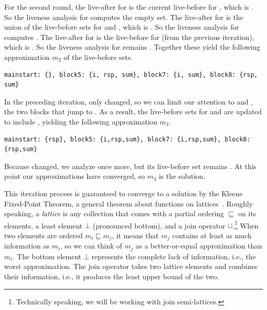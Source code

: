 \documentclass[7x10]{TimesAPriori_MIT}%
\begin{document}
For the second round, the live-after for  is the
current live-before for , which is .  So the
liveness analysis for  computes the empty set. The
live-after for  is the union of the live-before sets for
 and , which is .
So the liveness analysis for  computes .  The live-after for  is the live-before for
 (from the previous iteration), which is .
So the liveness analysis for  remains .  Together these yield the following approximation $m_2$ of
the live-before sets.
\begin{center}
  \begin{lstlisting}
mainstart: {}, block5: {i, rsp, sum}, block7: {i, sum}, block8: {rsp, sum}
\end{lstlisting}
\end{center}
In the preceding iteration, only  changed, so we can
limit our attention to  and , the two
blocks that jump to .  As a result, the live-before sets
for  and  are updated to include
, yielding the following approximation $m_3$.
\begin{center}
  \begin{lstlisting}
mainstart: {rsp}, block5: {i,rsp,sum}, block7: {i,rsp,sum}, block8: {rsp,sum}
\end{lstlisting}
\end{center}
Because  changed, we analyze  once more, but
its live-before set remains .  At this point
our approximations have converged, so $m_3$ is the solution.

This iteration process is guaranteed to converge to a solution by the
Kleene Fixed-Point Theorem, a general theorem about functions on
lattices~\citep{Kleene:1952aa}. Roughly speaking, a \emph{lattice} is
any collection that comes with a partial ordering $\sqsubseteq$ on its
elements, a least element $\bot$ (pronounced bottom), and a join
operator $\sqcup$.\footnote{Technically speaking, we will be
  working with join semi-lattices.} When two elements are ordered $m_i
\sqsubseteq m_j$, it means that $m_j$ contains at least as much
information as $m_i$, so we can think of $m_j$ as a better-or-equal
approximation than $m_i$.  The bottom element $\bot$ represents the
complete lack of information, i.e., the worst approximation.  The join
operator takes two lattice elements and combines their information,
i.e., it produces the least upper bound of the two.
\end{document}
